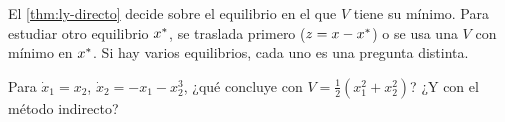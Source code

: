 \begin{cuidado}
El \cref{thm:ly-directo} decide sobre el equilibrio en el que $V$ tiene su mínimo. Para estudiar otro equilibrio $x^{*}$, se traslada primero ($z=x-x^{*}$) o se usa una $V$ con mínimo en $x^{*}$. Si hay varios equilibrios, cada uno es una pregunta distinta.
\end{cuidado}

\begin{pausa}
Para $\dot x_1=x_2$, $\dot x_2=-x_1-x_2^3$, ¿qué concluye con $V=\tfrac12(x_1^2+x_2^2)$? ¿Y con el método indirecto?
\end{pausa}
